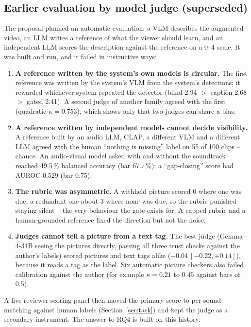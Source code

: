 \subsection{Earlier evaluation by model judge (superseded)}\label{app:judge}
The proposal planned an automatic evaluation: a VLM describes the augmented video, an LLM writes a reference of what
the viewer should learn, and an independent LLM scores the description against the reference on a 0--4 scale. It
was built and run, and it failed in instructive ways:
\begin{enumerate}
  \item \textbf{A reference written by the system's own models is circular.} The first reference was written by the
        system's VLM from the system's detections; it rewarded whichever system repeated the detector (blind 2.94 $>$
        caption 2.68 $>$ gated 2.41). A second judge of another family agreed with the first
        (quadratic $\kappa = 0.753$), which shows only that two judges can share a bias.
  \item \textbf{A reference written by independent models cannot decide visibility.} A reference built by an audio
        LLM, CLAP, a different VLM and a different LLM agreed with the human ``nothing is missing'' label on 55 of 100
        clips -- chance. An audio-visual model asked with and without the soundtrack reached 49.5\,\% balanced
        accuracy (bar 67.7\,\%); a ``gap-closing'' score had AUROC 0.529 (bar 0.75).
  \item \textbf{The rubric was asymmetric.} A withheld picture scored 0 where one was due, a redundant one about 3
        where none was due, so the rubric punished staying silent -- the very behaviour the gate exists for. A capped
        rubric and a human-grounded reference fixed the direction but not the noise.
  \item \textbf{Judges cannot tell a picture from a text tag.} The best judge (Gemma-4-31B seeing the pictures
        directly, passing all three trust checks against the author's labels) scored pictures and text tags alike
        ($-0.04\ [-0.22, +0.14]$), because it reads a tag as the label. Six automatic picture checkers also failed
        calibration against the author (for example $\kappa = 0.21$ to $0.45$ against bars of 0.5).
\end{enumerate}
A five-reviewer scoring panel then moved the primary score to per-sound matching against human labels
(Section~\ref{sec:task}) and kept the judge as a secondary instrument. The answer to RQ4 is built on this history.


